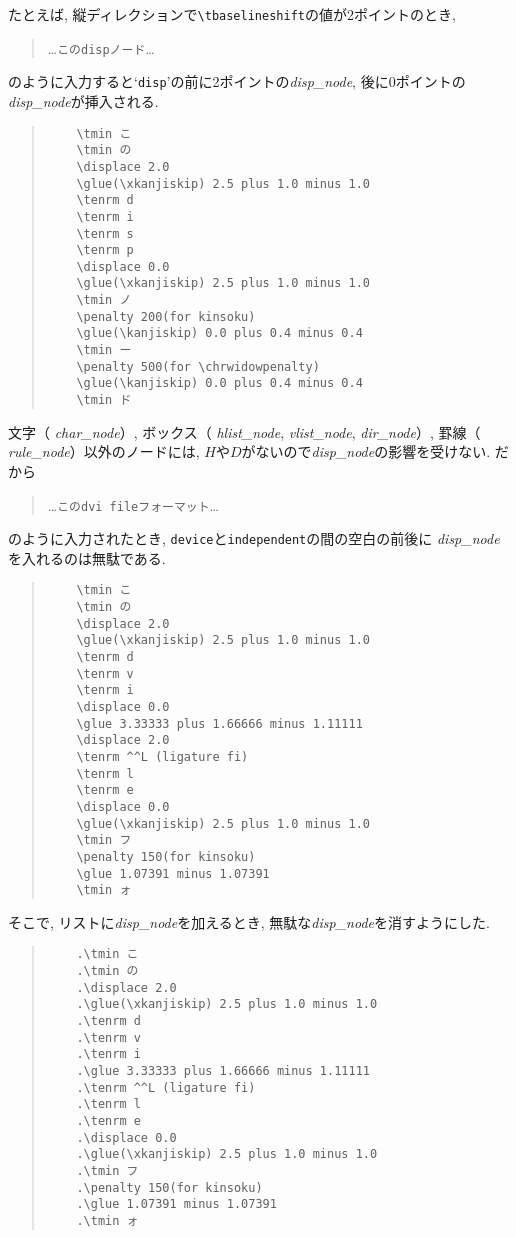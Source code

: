 たとえば, 縦ディレクションで\verb|\tbaselineshift|の値が2ポイントのとき,
\begin{quote}\gt
	\ldots\verb|このdispノード|\ldots
\end{quote}
のように入力すると`\verb|disp|'の前に2ポイントの{\it disp\_node\/},
後に0ポイントの{\it disp\_node\/}が挿入される.
\begin{quote}\gt\begin{verbatim}
	\tmin こ
	\tmin の
	\displace 2.0
	\glue(\xkanjiskip) 2.5 plus 1.0 minus 1.0
	\tenrm d
	\tenrm i
	\tenrm s
	\tenrm p
	\displace 0.0
	\glue(\xkanjiskip) 2.5 plus 1.0 minus 1.0
	\tmin ノ
	\penalty 200(for kinsoku)
	\glue(\kanjiskip) 0.0 plus 0.4 minus 0.4
	\tmin ー
	\penalty 500(for \chrwidowpenalty)
	\glue(\kanjiskip) 0.0 plus 0.4 minus 0.4
	\tmin ド
\end{verbatim} \end{quote}
文字（\kern0pt {\it char\_node\/}）,
ボックス（\kern0pt {\it hlist\_node\/}, {\it vlist\_node\/}, {\it dir\_node\/}）,
罫線（\kern0pt {\it rule\_node\/}）以外のノードには,
$H$や$D$がないので{\it disp\_node\/}の影響を受けない.
だから
\begin{quote}\gt
	\ldots\verb|このdvi fileフォーマット|\ldots
\end{quote}
のように入力されたとき, \verb|device|と\verb|independent|の間の空白の前後に
{\it disp\_node\/}を入れるのは無駄である.
\begin{quote}\gt\begin{verbatim}
	\tmin こ
	\tmin の
	\displace 2.0
	\glue(\xkanjiskip) 2.5 plus 1.0 minus 1.0
	\tenrm d
	\tenrm v
	\tenrm i
	\displace 0.0
	\glue 3.33333 plus 1.66666 minus 1.11111
	\displace 2.0
	\tenrm ^^L (ligature fi)
	\tenrm l
	\tenrm e
	\displace 0.0
	\glue(\xkanjiskip) 2.5 plus 1.0 minus 1.0
	\tmin フ
	\penalty 150(for kinsoku)
	\glue 1.07391 minus 1.07391
	\tmin ォ
\end{verbatim} \end{quote}
そこで, リストに{\it disp\_node\/}を加えるとき,
無駄な{\it disp\_node\/}を消すようにした.
\begin{quote}\gt\begin{verbatim}
	.\tmin こ
	.\tmin の
	.\displace 2.0
	.\glue(\xkanjiskip) 2.5 plus 1.0 minus 1.0
	.\tenrm d
	.\tenrm v
	.\tenrm i
	.\glue 3.33333 plus 1.66666 minus 1.11111
	.\tenrm ^^L (ligature fi)
	.\tenrm l
	.\tenrm e
	.\displace 0.0
	.\glue(\xkanjiskip) 2.5 plus 1.0 minus 1.0
	.\tmin フ
	.\penalty 150(for kinsoku)
	.\glue 1.07391 minus 1.07391
	.\tmin ォ
\end{verbatim} \end{quote}

